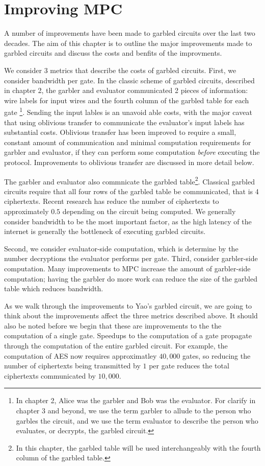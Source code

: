 \chapter{Improving MPC}
A number of improvements have been made to garbled circuits over the last two decades.
The aim of this chapter is to outline the major improvements made to garbled circuits and discuss the costs and benfits of the improvments.

We consider 3 metrics that describe the costs of garbled circuits.
First, we consider bandwidth per gate.
In the classic scheme of garbled circuits, described in chapter 2, the garbler and evaluator communicated 2 pieces of information: wire labels for input wires and the fourth column of the garbled table for each gate \footnote{In chapter 2, Alice was the garbler and Bob was the evaluator. For clarify in chapter 3 and beyond, we use the term garbler to allude to the person who garbles the circuit, and we use the term evaluator to describe the person who evaluates, or decrypts, the garbled circuit.}.
Sending the input lables is an unavoid able costs, with the major caveat that using oblivious transfer to communicate the evaluator's input labels has substantial costs.
Oblivious transfer has been improved to require a small, constant amount of communication and minimal computation requirements for garbler and evaluator, if they can perform some computation \textit{before} executing the protocol.
Improvements to oblivious transfer are discussed in more detail below.

The garbler and evaluator also commnicate the garbled table\footnote{In this chapter, the garbled table will be used interchangeably with the fourth column of the garbled table.}.
Classical garbled circuits require that all four rows of the garbled table be communicated, that is 4 ciphertexts.
Recent research has reduce the number of ciphertexts to approximately $0.5$ depending on the circuit being computed.
We generally consider bandwidth to be the most important factor, as the high latency of the internet is generally the bottleneck of executing garbled circuits.

Second, we consider evaluator-side computation, which is determine by the number decryptions the evaluator performs per gate.
Third, consider garbler-side computation.
Many improvements to MPC increase the amount of garbler-side computation; having the garbler do more work can reduce the size of the garbled table which reduces bandwidth.

As we walk through the improvements to Yao's garbled circuit, we are going to think about the improvements affect the three metrics described above.
It should also be noted before we begin that these are improvements to the the computation of a single gate.
Speedups to the computation of a gate propagate through the computation of the entire garbled circuit.
For example, the computation of AES now requires approximatley $40,000$ gates, so reducing the number of ciphertexts being transmitted by $1$ per gate reduces the total ciphertexts communicated by $10,000$.

